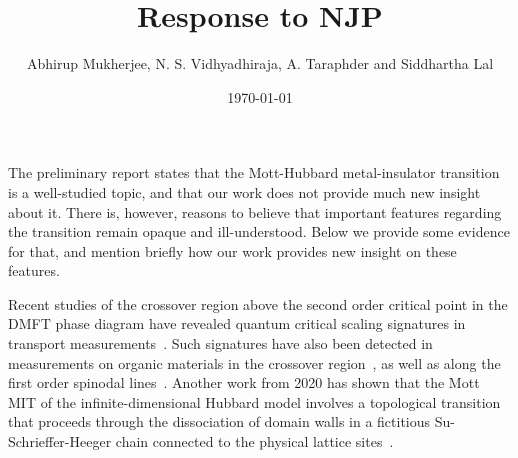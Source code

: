 \documentclass{article}
\begin{document}
\title{Response to NJP}

\author{Abhirup Mukherjee, N. S. Vidhyadhiraja, A. Taraphder and Siddhartha Lal}

\date{\today}
\maketitle

The preliminary report states that the Mott-Hubbard metal-insulator transition is a well-studied topic, and that our work does not provide much new insight about it. There is, however, reasons to believe that important features regarding the transition remain opaque and ill-understood. Below we provide some evidence for that, and mention briefly how our work provides new insight on these features.

Recent studies of the crossover region above the second order critical point in the DMFT phase diagram have revealed quantum critical scaling signatures in transport measurements~\cite{terletska_mott_2011,vucicevic_2013}. Such signatures have also been detected in measurements on organic materials in the crossover region~\cite{Kagawa2005,Furukawa2015}, as well as along the first order spinodal lines~\cite{satyaki_2020_PRL}. Another work from 2020 has shown that the Mott MIT of the infinite-dimensional Hubbard model involves a topological transition that proceeds through the dissociation of domain walls in a fictitious Su-Schrieffer-Heeger chain connected to the physical lattice sites~\cite{sen_mitchell_2020}.
\end{document}

